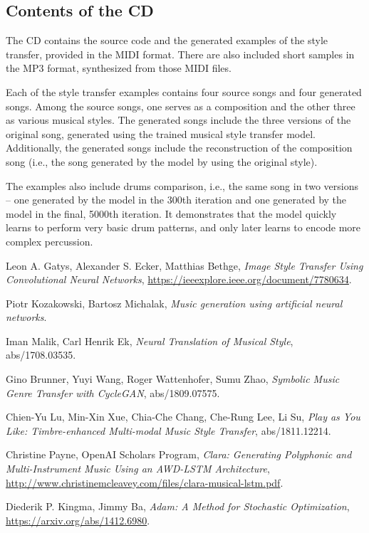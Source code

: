 \documentclass[en]{pracamgr}
\begin{document}
\begin{appendices}

\chapter{Contents of the CD}

The CD contains the source code and the generated examples of the style transfer, provided in the MIDI format.
There are also included short samples in the MP3 format, synthesized from those MIDI files.

Each of the style transfer examples contains four source songs and four generated songs.
Among the source songs, one serves as a composition and the other three as various musical styles.
The generated songs include the three versions of the original song, generated using the trained musical style transfer model.
Additionally, the generated songs include the reconstruction of the composition song (i.e., the song generated by the model by using the original style).

The examples also include drums comparison, i.e., the same song in two versions -- one generated by the model in the 300th iteration and one generated by the model in the final, 5000th iteration.
It demonstrates that the model quickly learns to perform very basic drum patterns, and only later learns to encode more complex percussion.

\end{appendices}

\begin{thebibliography}{99}

{}

 Leon A. Gatys, Alexander S. Ecker, Matthias Bethge, \textit{Image Style Transfer Using Convolutional Neural Networks}, \url{https://ieeexplore.ieee.org/document/7780634}.

 Piotr Kozakowski, Bartosz Michalak, \textit{Music generation using artificial neural networks}.

 Iman Malik, Carl Henrik Ek, \textit{Neural Translation of Musical Style}, abs/1708.03535.

 Gino Brunner, Yuyi Wang, Roger Wattenhofer, Sumu Zhao, \textit{Symbolic Music Genre Transfer with CycleGAN}, abs/1809.07575.

 Chien-Yu Lu, Min-Xin Xue, Chia-Che Chang, Che-Rung Lee, Li Su, \textit{Play as You Like: Timbre-enhanced Multi-modal Music Style Transfer}, abs/1811.12214.

 Christine Payne, OpenAI Scholars Program, \textit{Clara: Generating Polyphonic and Multi-Instrument Music Using an AWD-LSTM Architecture}, \url{http://www.christinemcleavey.com/files/clara-musical-lstm.pdf}.

 Diederik P. Kingma, Jimmy Ba, \textit{Adam: A Method for Stochastic Optimization}, \url{https://arxiv.org/abs/1412.6980}.

\end{thebibliography}
\end{document}
